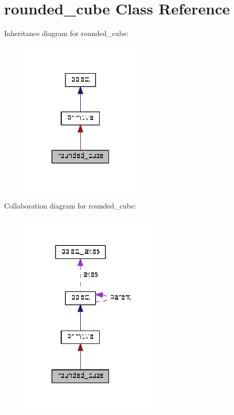 \hypertarget{classrounded__cube}{}\section{rounded\+\_\+cube Class Reference}
\label{classrounded__cube}


Inheritance diagram for rounded\+\_\+cube\+:\nopagebreak
\begin{figure}[H]
\begin{center}
\leavevmode
\includegraphics[width=163pt]{classrounded__cube__inherit__graph}
\end{center}
\end{figure}


Collaboration diagram for rounded\+\_\+cube\+:\nopagebreak
\begin{figure}[H]
\begin{center}
\leavevmode
\includegraphics[width=196pt]{classrounded__cube__coll__graph}
\end{center}
\end{figure}
